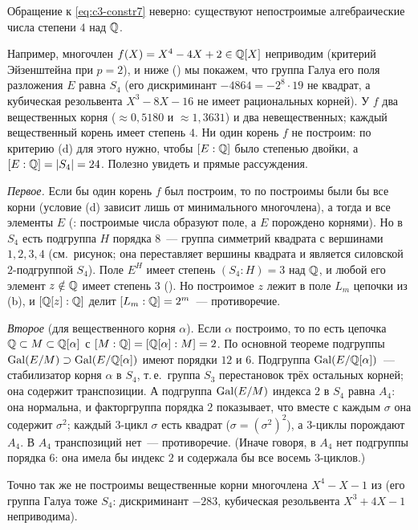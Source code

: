 \begin{remark}[3.27]
Обращение к \eqref{eq:c3-constr7} неверно: существуют непостроимые алгебраические числа степени $4$ над $\mathbb Q$.

Например, многочлен $f(X)=X^4-4X+2\in\mathbb Q[X]$ неприводим (критерий Эйзенштейна при $p=2$), и ниже () мы
покажем, что группа Галуа его поля разложения $E$ равна $S_4$ (его дискриминант $-4864=-2^8\cdot19$ не квадрат, а
кубическая резольвента $X^3-8X-16$ не имеет рациональных корней). У $f$ два вещественных корня ($\approx0{,}5180$ и
$\approx1{,}3631$) и два невещественных; каждый вещественный корень имеет степень $4$. Ни один корень $f$ не построим:
по критерию (d) для этого нужно, чтобы $[E:\mathbb Q]$ было степенью двойки, а $[E:\mathbb Q]=|S_4|=24$. Полезно
увидеть и прямые рассуждения.

\emph{Первое.} Если бы один корень $f$ был построим, то по  построимы были бы все корни (условие (d) зависит
лишь от минимального многочлена), а тогда и все элементы $E$ (: построимые числа образуют поле, а $E$
порождено корнями). Но в $S_4$ есть подгруппа $H$ порядка $8$~--- группа симметрий квадрата с вершинами $1,2,3,4$ (см.\
рисунок; она переставляет вершины квадрата и является силовской $2$-подгруппой $S_4$). Поле $E^H$ имеет степень
$(S_4:H)=3$ над $\mathbb Q$, и любой его элемент $z\notin\mathbb Q$ имеет степень $3$ (\rf{1.20}). Но построимое $z$ лежит в поле $L_m$ цепочки из
\rf{3.25b}(b), и $[\mathbb Q[z]:\mathbb Q]$ делит $[L_m:\mathbb Q]=2^m$~--- противоречие.

\emph{Второе} (для вещественного корня $\alpha$). Если $\alpha$ построимо, то по  есть цепочка
$\mathbb Q\subset M\subset\mathbb Q[\alpha]$ с $[M:\mathbb Q]=[\mathbb Q[\alpha]:M]=2$. По основной теореме подгруппы $\operatorname{Gal}(E/M)\supset\operatorname{Gal}(E/\mathbb Q[\alpha])$
имеют порядки $12$ и $6$. Подгруппа $\operatorname{Gal}(E/\mathbb Q[\alpha])$~--- стабилизатор корня $\alpha$ в $S_4$, т.\,е.\ группа $S_3$
перестановок трёх остальных корней; она содержит транспозиции. А подгруппа $\operatorname{Gal}(E/M)$ индекса $2$ в $S_4$ равна
$A_4$: она нормальна, и факторгруппа порядка $2$ показывает, что вместе с каждым $\sigma$ она содержит $\sigma^2$;
каждый $3$-цикл $\sigma$ есть квадрат ($\sigma=(\sigma^2)^2$), а $3$-циклы порождают $A_4$. В $A_4$ транспозиций нет~---
противоречие. (Иначе говоря, в $A_4$ нет подгруппы порядка $6$: она имела бы индекс $2$ и содержала бы все восемь
$3$-циклов.)

Точно так же не построимы вещественные корни многочлена $X^4-X-1$ из  (его группа Галуа тоже $S_4$:
дискриминант $-283$, кубическая резольвента $X^3+4X-1$ неприводима).
\end{remark}

